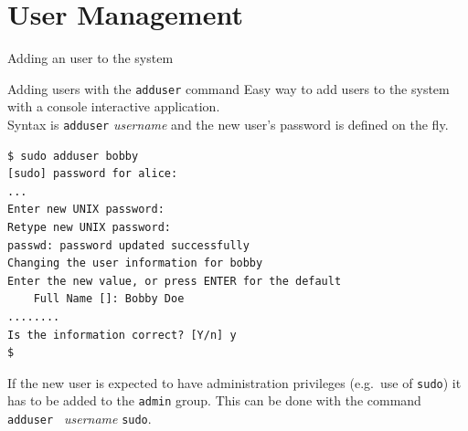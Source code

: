 \section{User Management}
\begin{frame}[t,fragile]{Adding an user to the system}


  \begin{block}{Adding users with the \alert{\texttt{adduser}} command}
    {\footnotesize
Easy way to add users to the system with a console interactive application. \\Syntax is \alert{\texttt{adduser} \emph{username}} and the new user's password is defined on the fly.}

{\scriptsize
  \begin{lstlisting}
$ sudo adduser bobby
[sudo] password for alice: 
...
Enter new UNIX password: 
Retype new UNIX password: 
passwd: password updated successfully
Changing the user information for bobby
Enter the new value, or press ENTER for the default
	Full Name []: Bobby Doe
........
Is the information correct? [Y/n] y
$ 
  \end{lstlisting}
}
    {\footnotesize
If the new user is expected to have administration privileges (e.g.\ use of \texttt{sudo})  it has to be added to the \texttt{admin} group. This can be done with the command \\\alert{\texttt{adduser } \emph{username} \texttt{sudo}}.}

  \end{block}
  
\end{frame}
